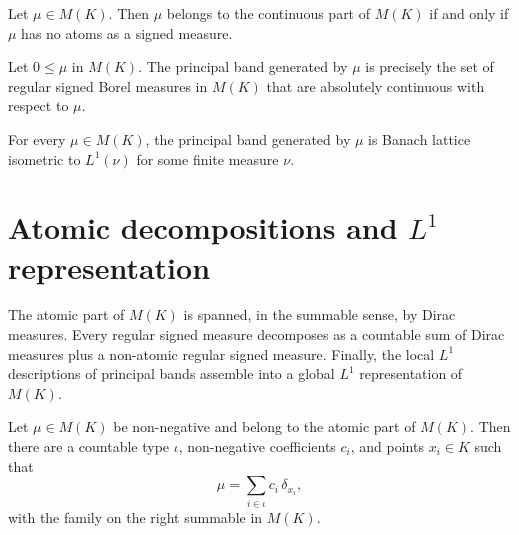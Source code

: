 \begin{theorem}
\label{thm:mofK-mem-continuousPart-iff}
\leanok
{}
Let $\mu \in M(K)$. Then $\mu$ belongs to the continuous part of
$M(K)$ if and only if $\mu$ has no atoms as a signed measure.
\end{theorem}

\begin{theorem}
\label{thm:mofK-band-generated-singleton-eq-absolutelyContinuous}
\leanok
{}
Let $0 \le \mu$ in $M(K)$. The principal band generated by $\mu$
is precisely the set of regular signed Borel measures in $M(K)$
that are absolutely continuous with respect to $\mu$.
\end{theorem}

\begin{theorem}
\label{thm:mofK-exists-principalBand-banachLatEquivL1}
\leanok
{}
For every $\mu \in M(K)$, the principal band generated by $\mu$ is
Banach lattice isometric to $L^1(\nu)$ for some finite measure
$\nu$.
\end{theorem}

\section{Atomic decompositions and \(L^1\) representation}

The atomic part of $M(K)$ is spanned, in the summable sense, by
Dirac measures. Every regular signed measure decomposes as a
countable sum of Dirac measures plus a non-atomic regular signed
measure. Finally, the local $L^1$ descriptions of principal bands
assemble into a global $L^1$ representation of $M(K)$.

\begin{theorem}
\label{thm:mofK-exists-nonneg-sum-dirac-of-mem-atomicPart}
\leanok
{}
Let $\mu \in M(K)$ be non-negative and belong to the atomic part of
$M(K)$. Then there are a countable type $\iota$, non-negative
coefficients $c_i$, and points $x_i \in K$ such that
\[
  \mu = \sum_{i \in \iota} c_i\,\delta_{x_i},
\]
with the family on the right summable in $M(K)$.
\end{theorem}

